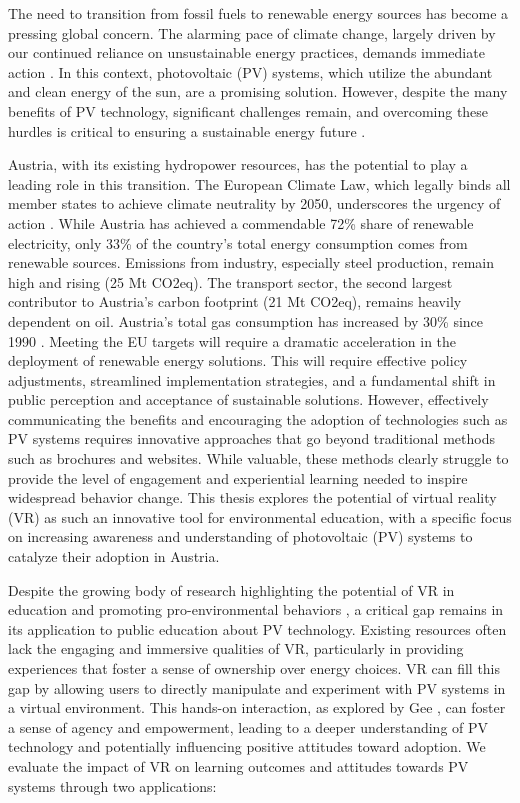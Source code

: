 \documentclass[draft, final]{vutinfth} %
\begin{document}
The need to transition from fossil fuels to renewable energy sources has become a pressing global concern. The alarming pace of climate change, largely driven by our continued reliance on unsustainable energy practices, demands immediate action \cite{IPCC_2018_SR15}. In this context, photovoltaic (PV) systems, which utilize the abundant and clean energy of the sun, are a promising solution. However, despite the many benefits of PV technology, significant challenges remain, and overcoming these hurdles is critical to ensuring a sustainable energy future \cite{iea2020world}.

Austria, with its existing hydropower resources, has the potential to play a leading role in this transition. The European Climate Law, which legally binds all member states to achieve climate neutrality by 2050, underscores the urgency of action \cite{EUClimateLaw}.
While Austria has achieved a commendable 72\% share of renewable electricity, only 33\% of the country's total energy consumption comes from renewable sources. Emissions from industry, especially steel production, remain high and rising (25 Mt CO2eq). The transport sector, the second largest contributor to Austria's carbon footprint (21 Mt CO2eq), remains heavily dependent on oil. Austria's total gas consumption has increased by 30\% since 1990 \cite{StatistikAustria2024Energiebilanzen}. Meeting the EU targets will require a dramatic acceleration in the deployment of renewable energy solutions. This will require effective policy adjustments, streamlined implementation strategies, and a fundamental shift in public perception and acceptance of sustainable solutions. However, effectively communicating the benefits and encouraging the adoption of technologies such as PV systems requires innovative approaches that go beyond traditional methods such as brochures and websites. While valuable, these methods clearly struggle to provide the level of engagement and experiential learning needed to inspire widespread behavior change. This thesis explores the potential of virtual reality (VR) as such an innovative tool for environmental education, with a specific focus on increasing awareness and understanding of photovoltaic (PV) systems to catalyze their adoption in Austria.

Despite the growing body of research highlighting the potential of VR in education \cite{HuAu2018VrExperience,Merchant2014VrEffectiveness} and promoting pro-environmental behaviors \cite{Queiroz2023Efficacy,McEvoy2023Climate}, a critical gap remains in its application to public education about PV technology. Existing resources often lack the engaging and immersive qualities of VR, particularly in providing experiences that foster a sense of ownership over energy choices. VR can fill this gap by allowing users to directly manipulate and experiment with PV systems in a virtual environment. This hands-on interaction, as explored by Gee \cite{Gee2009Deep}, can foster a sense of agency and empowerment, leading to a deeper understanding of PV technology and potentially influencing positive attitudes toward adoption. We evaluate the impact of VR on learning outcomes and attitudes towards PV systems through two applications:
\end{document}
